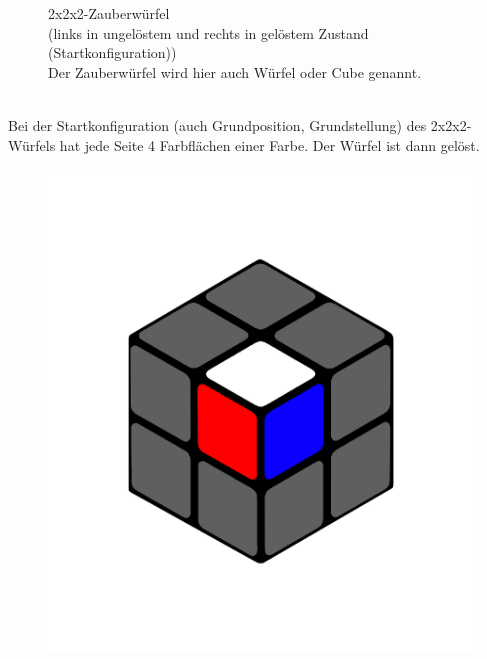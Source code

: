 \documentclass[12pt,a4paper, usenames, dvipsnames]{article}
\begin{document}
\begin{figure}[h]
\caption[ungelöster und gelöster 2x2x2-Würfel]{2x2x2-Zauberwürfel \\ (links in ungelöstem und rechts in gelöstem Zustand (Startkonfiguration)) \\
Der Zauberwürfel wird hier auch Würfel oder Cube genannt.}
\end{figure}
\ \\
Bei der Startkonfiguration (auch Grundposition, Grundstellung) des 2x2x2-Würfels hat jede Seite 4 Farbflächen einer Farbe. Der Würfel ist dann gelöst. \\

\begin{figure}[h]
\centering
\includegraphics[scale=0.1]{2x2stein.png}

\end{figure}
\end{document}
